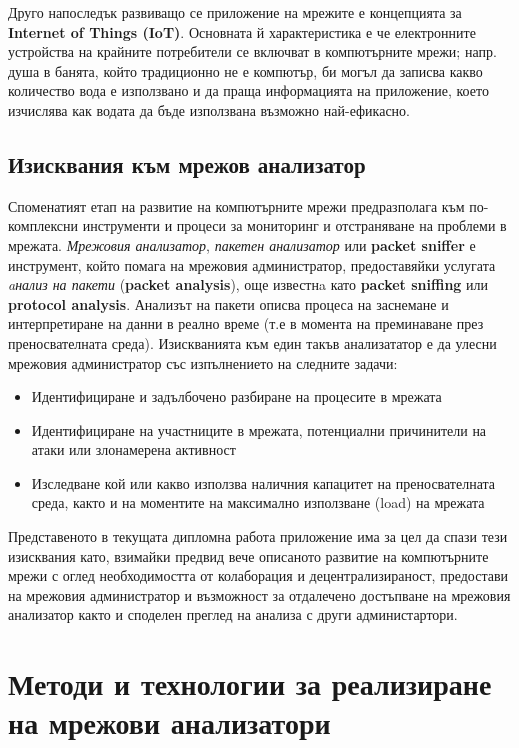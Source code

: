 \documentclass[12pt,a4paper,oneside]{book}
\begin{document}
Друго напоследък развиващо се приложение на мрежите е концепцията за 
\textbf{Internet of Things (IoT)}. Основната й характеристика е че електронните
устройства на крайните потребители се включват в компютърните мрежи; напр. душа
в банята, който традиционно не е компютър, би могъл да записва какво количество
вода е използвано и да праща информацията на приложение, което изчислява как
водата да бъде използвана възможно най-ефикасно.  \cite{tanenbaum_computer_2011}

\section{Изисквания към мрежов анализатор}

Споменатият етап на развитие на компютърните мрежи предразполага към
по-комплексни инструменти и процеси за мониторинг и отстраняване на проблеми в
мрежата. \textit{Мрежовия анализатор}, \textit{пакетен анализатор} или
\textbf{packet sniffer} е
инструмент, който помага на мрежовия администратор, предоставяйки услугата
\textit{aнализ на пакети} (\textbf{packet analysis}), още известнa като
\textbf{packet sniffing} или \textbf{protocol analysis}. Анализът на пакети
описва процеса на заснемане и интерпретиране на данни в реално време
(т.е в момента на преминаване през преносвателната среда). Изискванията към
един такъв анализататор е да улесни мрежовия администратор със изпълнението
на следните задачи:

\begin{itemize}
  \item
  Идентифициране и задълбочено разбиране на процесите в мрежата
\item
  Идентифициране на участниците в мрежата, потенциални причинители на атаки или
  злонамерена активност
\item
  Изследване кой или какво използва наличния капацитет на преносвателната
  среда, както и на моментите на максимално използване (load) на мрежата
\end{itemize}

Представеното в текущата дипломна работа приложение има за цел да спази тези
изисквания като, взимайки предвид вече описаното развитие на компютърните мрежи
с оглед необходимостта от колаборация и децентрализираност, предостави на
мрежовия администратор и възможност за отдалечено достъпване на мрежовия анализатор
както и споделен преглед на анализа с други администартори.
\justify
\chapter{Методи и технологии за реализиране на мрежови анализатори}
\end{document}

